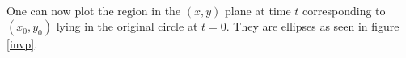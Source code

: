 \begin{enumerate}
\begin{enumerate}
\begin{align}
\end{align}
One can now plot the region in the $(x,y)$ plane at time $t$ corresponding to $(x_0,y_0)$ lying in the original circle at $t=0$. They are ellipses as seen in figure \ref{invp}.
\begin{figure}[!h]
	\centering
	

\end{figure}
\end{enumerate}
\end{enumerate}
